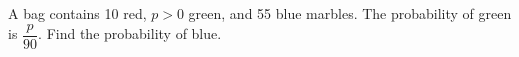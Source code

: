 A bag contains 10 red, $ p>0 $ green, and 55 blue marbles. The probability of green is $\dfrac{p}{90}$. Find the probability of blue.
